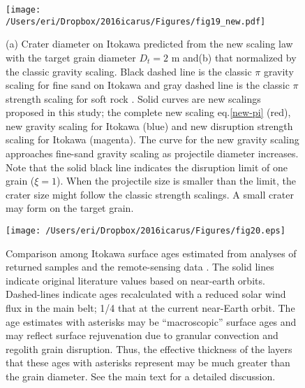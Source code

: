 \documentclass[3p,authoryear]{elsarticle}
\begin{document}
\begin{figure}[htbp]
	\begin{center}
	\texttt{[image: /Users/eri/Dropbox/2016icarus/Figures/fig19\_new.pdf]}
	\caption{(a) Crater diameter on Itokawa predicted from the new scaling law with the target grain diameter $D_t=2$ m and(b) that normalized by the classic gravity scaling. Black dashed line is the classic $\pi$ gravity scaling \citep[e.g.][]{holsapple1993} for fine sand on Itokawa and gray dashed line is the classic $\pi$ strength scaling for soft rock \citep{holsapple1993}. Solid curves are new scalings proposed in this study; the complete new scaling eq.\eqref{new-pi} (red), new gravity scaling for Itokawa (blue) and new disruption strength scaling for Itokawa (magenta). The curve for the new gravity scaling approaches fine-sand gravity scaling as projectile diameter increases. Note that the solid black line indicates the disruption limit of one grain ($\xi=1$). When the projectile size is smaller than the limit, the crater size might follow the classic strength scalings. A small crater may form on the target grain. }
	\label{Itokawa-crater}
	\end{center}
\end{figure}

\begin{figure}[htbp]
	\centering
	\texttt{[image: /Users/eri/Dropbox/2016icarus/Figures/fig20.eps]}
	\caption{Comparison among Itokawa surface ages estimated from analyses of returned samples and the remote-sensing data \citep{obrien2005, michel2009, nagao2011, basilevsky2014, koga2014, meier2014, noguchi2014, berger2015, bonal2015, nishiizumi2015, park2015}. The solid lines indicate original literature values based on near-earth orbits. Dashed-lines indicate ages recalculated with a reduced solar wind flux in the main belt; 1/4 that at the current near-Earth orbit. The age estimates with asterisks may be “macroscopic” surface ages and may reflect surface rejuvenation due to granular convection and regolith grain disruption. Thus, the effective thickness of the layers that these ages with asterisks represent may be much greater than the grain diameter. See the main text for a detailed discussion. }
	\label{itokawa-ages}
	\centering
\end{figure}



\end{document}
